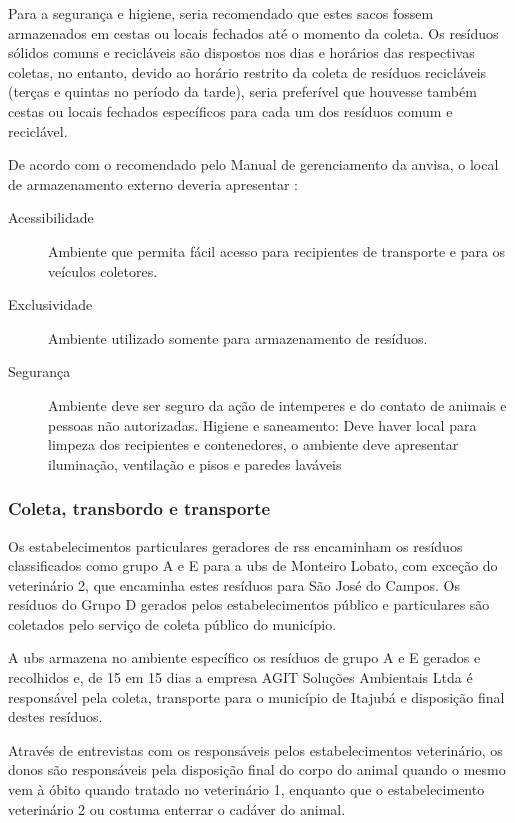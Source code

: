 	
	Para a segurança e higiene, seria recomendado que estes sacos fossem armazenados em cestas ou locais fechados até o momento da coleta. Os resíduos sólidos comuns e recicláveis são dispostos nos dias e horários das respectivas coletas, no entanto, devido ao horário restrito da coleta de resíduos recicláveis (terças e quintas no período da tarde), seria preferível que houvesse também cestas ou locais fechados específicos para cada um dos resíduos comum e reciclável.

	De acordo com o recomendado pelo Manual de gerenciamento da \gls{anvisa}, o local de armazenamento externo deveria apresentar \cite{anvisa:2006}:
	
	\begin{description}
		\item [Acessibilidade] Ambiente que permita fácil acesso para recipientes de transporte e para os veículos coletores.
		\item[Exclusividade] Ambiente utilizado somente para armazenamento de resíduos.
		\item[Segurança] Ambiente deve ser seguro da ação de intemperes e do contato de animais e pessoas não autorizadas.
		Higiene e saneamento: Deve haver local para limpeza dos recipientes e contenedores, o ambiente deve apresentar iluminação, ventilação e pisos e paredes laváveis
	\end{description}

	\subsubsection{Coleta, transbordo e transporte} 
	Os estabelecimentos particulares geradores de \gls{rss} encaminham os resíduos classificados como grupo A e E para a \gls{ubs} de Monteiro Lobato, com exceção do veterinário 2, que encaminha estes resíduos para São José do Campos. Os resíduos do Grupo D gerados pelos estabelecimentos público e particulares são coletados pelo serviço de coleta público do município.
	
	A \gls{ubs} armazena no ambiente específico os resíduos de grupo A e E gerados e recolhidos e, de 15 em 15 dias a empresa AGIT Soluções Ambientais Ltda é responsável pela coleta, transporte para o município de Itajubá e disposição final destes resíduos.
	
	Através de entrevistas com os responsáveis pelos estabelecimentos veterinário, os donos são responsáveis pela disposição final do corpo do animal quando o mesmo vem à óbito quando tratado no veterinário 1, enquanto que o estabelecimento veterinário 2 ou costuma enterrar o cadáver do animal.
	
